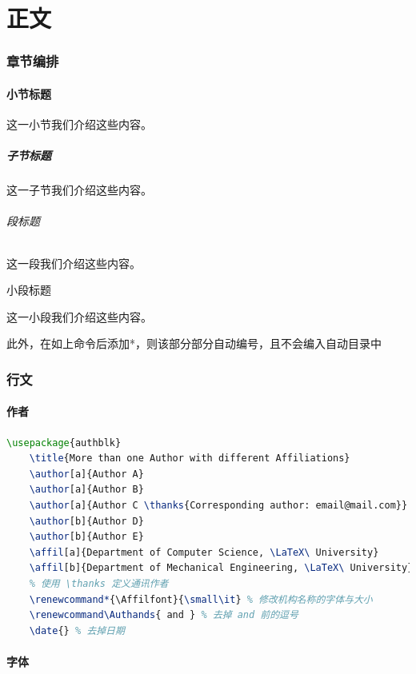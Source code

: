 \part{正文} %
\section{章节编排} %
\subsection{小节标题}这一小节我们介绍这些内容。
\subsubsection{子节标题}这一子节我们介绍这些内容。
\paragraph{段标题}这一段我们介绍这些内容。
\subparagraph{小段标题}这一小段我们介绍这些内容。

此外，在如上命令后添加*，则该部分部分自动编号，且不会编入自动目录中

\section{行文}

\subsection{作者}
\begin{lstlisting}[language={TeX}]
    \usepackage{authblk}
    \title{More than one Author with different Affiliations}
    \author[a]{Author A}
    \author[a]{Author B}
    \author[a]{Author C \thanks{Corresponding author: email@mail.com}}
    \author[b]{Author D}
    \author[b]{Author E}
    \affil[a]{Department of Computer Science, \LaTeX\ University}
    \affil[b]{Department of Mechanical Engineering, \LaTeX\ University}
    % 使用 \thanks 定义通讯作者
    \renewcommand*{\Affilfont}{\small\it} % 修改机构名称的字体与大小
    \renewcommand\Authands{ and } % 去掉 and 前的逗号
    \date{} % 去掉日期
\end{lstlisting}


\subsection{字体}
